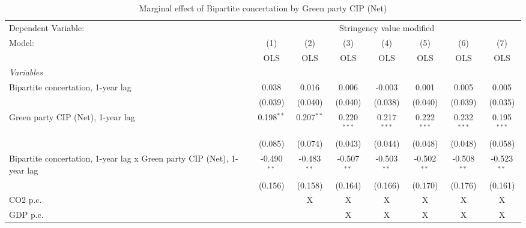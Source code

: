 
\begin{table}[htbp]
   \caption{Marginal effect of Bipartite concertation by Green party CIP (Net)}
   \centering
   \begin{tabular}{lccccccc}
      \toprule
      Dependent Variable: & \multicolumn{7}{c}{Stringency value modified}\\
      Model:                                                                 & (1)           & (2)           & (3)           & (4)           & (5)           & (6)           & (7)\\  
                                                                             &  OLS          & OLS           & OLS           & OLS           & OLS           & OLS           & OLS\\  
      \midrule
      \emph{Variables}\\
      Bipartite concertation, 1-year lag                                     & 0.038         & 0.016         & 0.006         & -0.003        & 0.001         & 0.005         & 0.005\\   
                                                                             & (0.039)       & (0.040)       & (0.040)       & (0.038)       & (0.040)       & (0.039)       & (0.035)\\   
      Green party CIP (Net), 1-year lag                                      & 0.198$^{**}$  & 0.207$^{**}$  & 0.220$^{***}$ & 0.217$^{***}$ & 0.222$^{***}$ & 0.232$^{***}$ & 0.195$^{***}$\\   
                                                                             & (0.085)       & (0.074)       & (0.043)       & (0.044)       & (0.048)       & (0.048)       & (0.058)\\   
      Bipartite concertation, 1-year lag x Green party CIP (Net), 1-year lag & -0.490$^{**}$ & -0.483$^{**}$ & -0.507$^{**}$ & -0.503$^{**}$ & -0.502$^{**}$ & -0.508$^{**}$ & -0.523$^{**}$\\   
                                                                             & (0.156)       & (0.158)       & (0.164)       & (0.166)       & (0.170)       & (0.176)       & (0.161)\\   
      CO2 p.c.                                                               &               & X             & X             & X             & X             & X             & X\\  
      GDP p.c.                                                               &               &               & X             & X             & X             & X             & X\\  

\end{tabular}
\end{table}
